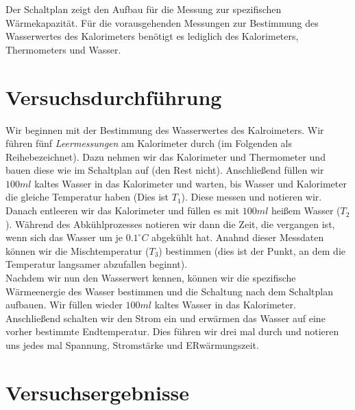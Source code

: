 \documentclass[10pt,a4paper]{article}
\begin{document}
\begin{flushleft}
Der Schaltplan zeigt den Aufbau für die Messung zur spezifischen Wärmekapazität. Für die vorausgehenden Messungen zur Bestimmung des Wasserwertes des Kalorimeters benötigt es lediglich des Kalorimeters, Thermometers und Wasser.
\end{flushleft}

\section{Versuchsdurchführung}
\begin{flushleft}
Wir beginnen mit der Bestimmung des Wasserwertes des Kalroimeters. Wir führen fünf \textit{Leermessungen} am Kalorimeter durch (im Folgenden als \glqq Reihe\grqq bezeichnet). Dazu nehmen wir das Kalorimeter und Thermometer und bauen diese wie im Schaltplan auf (den Rest nicht). Anschließend füllen wir $100 ml$ kaltes Wasser in das Kalorimeter und warten, bis Wasser und Kalorimeter die gleiche Temperatur haben (Dies ist $T_1$). Diese messen und notieren wir. Danach entleeren wir das Kalorimeter und füllen es mit $100 ml$ heißem Wasser ($T_2$). Während des Abkühlprozesses notieren wir dann die Zeit, die vergangen ist, wenn sich das Wasser um je $0.1^{\circ}C$ abgekühlt hat. Anahnd dieser Messdaten können wir die Mischtemperatur ($T_3$) bestimmen (dies ist der Punkt, an dem die Temperatur langsamer abzufallen beginnt). \\

Nachdem wir nun den Wasserwert kennen, können wir die spezifische Wärmeenergie des Wasser bestimmen und die Schaltung nach dem Schaltplan aufbauen. Wir füllen wieder $100ml$ kaltes Wasser in das Kalorimeter. Anschließend schalten wir den Strom ein und erwärmen das Wasser auf eine vorher bestimmte Endtemperatur. Dies führen wir drei mal durch und notieren uns jedes mal Spannung, Stromstärke und ERwärmungszeit.
\end{flushleft}

\newpage

\section{Versuchsergebnisse}
\hypertarget{VersErg}{}
\end{document}
